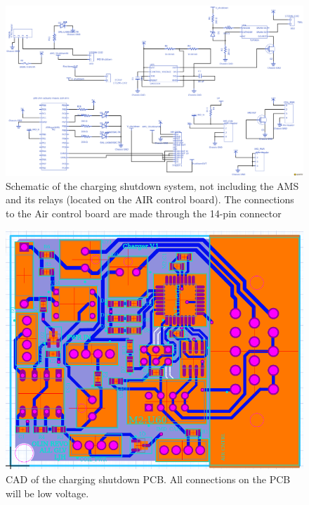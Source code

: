 \documentclass{article}
\begin{document}
\begin{figure}[H]
    \centering
    \includegraphics[width = 0.7 \textwidth]{chargingschem}
    \caption{Schematic of the charging shutdown system, not including the AMS and its relays (located on the AIR control board). The connections to the Air control board are made through the 14-pin connector}
    \label{chargerschem}
\end{figure}

\begin{figure}[H]
    \centering
    \includegraphics[width = 0.7 \textwidth]{chargerPCB}
    \caption{CAD of the charging shutdown PCB. All connections on the PCB will be low voltage.}
    \label{chargerPCB}
\end{figure}
\end{document}
